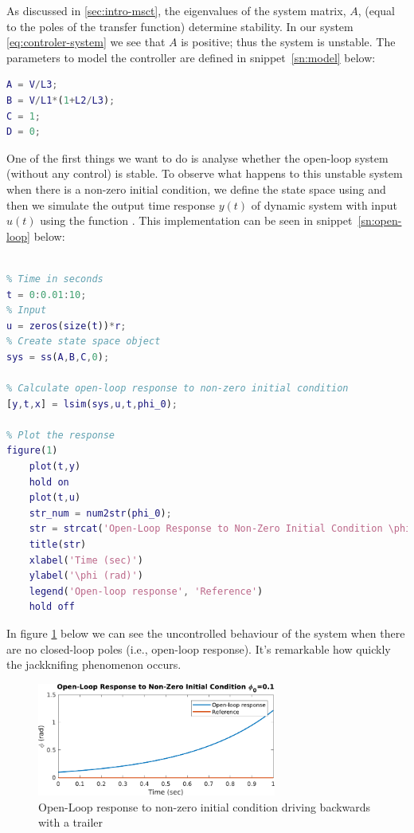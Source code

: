 As discussed in \cref{sec:intro-msct}, the eigenvalues of the system matrix, $A$, (equal to the poles of the transfer function) determine stability. In our system \eqref{eq:controler-system} we see that $A$ is positive; thus the system is unstable. The parameters to model the controller are defined in snippet~\ref{sn:model} below:
\begin{lstlisting}[language=matlab, label=sn:model, caption=Basic parameters to model the controller, firstnumber=13]
%% Model
A = V/L3;
B = V/L1*(1+L2/L3);
C = 1;
D = 0;
\end{lstlisting}

One of the first things we want to do is analyse whether the open-loop system (without any control) is stable. To observe what happens to this unstable system when there is a non-zero initial condition, we define the state space using  and then we simulate the output time response $y(t)$ of dynamic system with input $u(t)$ using the function . This implementation can be seen in snippet~\ref{sn:open-loop} below:
\begin{lstlisting}[language=matlab, label=sn:open-loop, caption=Method to calculate open-loop response to non-zero initial condition, firstnumber=20]
%% Calculate open-loop response to non-zero initial condition

% Time in seconds
t = 0:0.01:10;
% Input
u = zeros(size(t))*r;
% Create state space object
sys = ss(A,B,C,0);

% Calculate open-loop response to non-zero initial condition
[y,t,x] = lsim(sys,u,t,phi_0);

% Plot the response
figure(1)
	plot(t,y)
	hold on
	plot(t,u)
	str_num = num2str(phi_0);
	str = strcat('Open-Loop Response to Non-Zero Initial Condition \phi_0=', str_num);
	title(str)
	xlabel('Time (sec)')
	ylabel('\phi (rad)')
	legend('Open-loop response', 'Reference')
	hold off
\end{lstlisting}

In figure \ref{fig:curve-open-loop} below we can see the uncontrolled behaviour of the system when there are no closed-loop poles (i.e., open-loop response). It's remarkable how quickly the jackknifing phenomenon occurs.
\begin{figure}[H]
	\centering
	\includegraphics[width=0.7\textwidth]{images/curve-open-loop}
	\caption{Open-Loop response to non-zero initial condition driving backwards with a trailer}
	\label{fig:curve-open-loop}
\end{figure}

